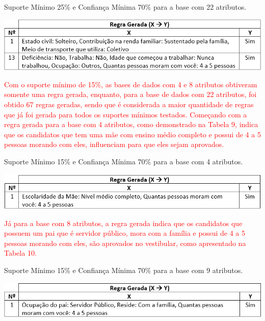\par
\begin{table}[!htp]
	\begin{center}
    \caption{\label{fig:waveform_fig} Suporte Mínimo 25\% e Confiança Mínima 70\% para a base com 22 atributos.}
	\includegraphics[scale=0.75]{Figuras/Suporte_25_atributos_22.png}
	\end{center}
\end{table}

\par
\textcolor{red}{Com o suporte mínimo de 15\%, as bases de dados com 4 e 8 atributos obtiveram somente uma regra gerada, enquanto, para a base de dados com 22 atributos, foi obtido 67 regras geradas, sendo que é considerada a maior quantidade de regras que já foi gerada para todos os suportes mínimos testados. Começando com a regra gerada para a base com 4 atributos, como demonstrado na Tabela 9, indica que os candidatos que tem uma mãe com ensino médio completo e possui de 4 a 5 pessoas morando com eles, influenciam para que eles sejam aprovados.}

\par
\begin{table}[!htp]
	\begin{center}
    \caption{\label{fig:waveform_fig} Suporte Mínimo 15\% e Confiança Mínima 70\% para a base com 4 atributos.}
	\includegraphics[scale=0.75]{Figuras/Suporte_15_atributos_4.png}
	\end{center}
\end{table}

\par
\textcolor{red}{Já para a base com 8 atributos, a regra gerada indica que os candidatos que possuem um pai que é servidor público, mora com a família e possui de 4 a 5 pessoas morando com eles, são aprovados no vestibular, como apresentado na Tabela 10.}

\par
\begin{table}[!htp]
	\begin{center}
    \caption{\label{fig:waveform_fig} Suporte Mínimo 15\% e Confiança Mínima 70\% para a base com 9 atributos.}
	\includegraphics[scale=0.75]{Figuras/Suporte_15_atributos_9.png}
	\end{center}
\end{table}

